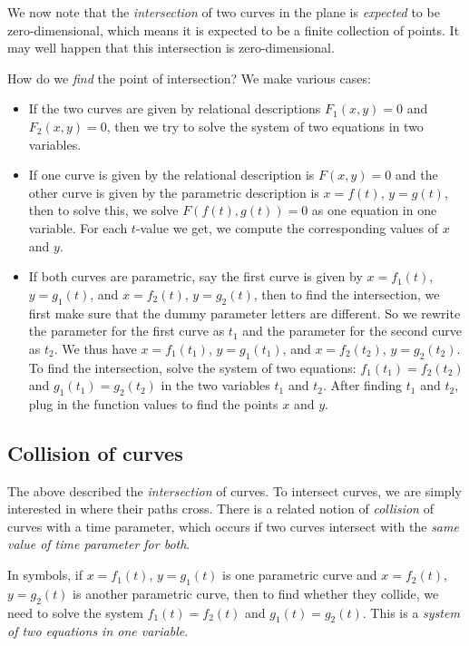 \documentclass[10pt]{amsart}
\begin{document}
We now note that the {\em intersection} of two curves in the plane is
{\em expected} to be zero-dimensional, which means it is expected to
be a finite collection of points. It may well happen that this
intersection is zero-dimensional.

How do we {\em find} the point of intersection? We make various cases:

\begin{itemize}
\item If the two curves are given by relational descriptions $F_1(x,y)
  = 0$ and $F_2(x,y) = 0$, then we try to solve the system of two
  equations in two variables.
\item If one curve is given by the relational description is $F(x,y) =
  0$ and the other curve is given by the parametric description is $x
  = f(t)$, $y = g(t)$, then to solve this, we solve $F(f(t),g(t)) = 0$
  as one equation in one variable. For each $t$-value we get, we
  compute the corresponding values of $x$ and $y$.
\item If both curves are parametric, say the first curve is given by
  $x = f_1(t)$, $y = g_1(t)$, and $x = f_2(t)$, $y = g_2(t)$, then to
  find the intersection, we first make sure that the dummy parameter
  letters are different. So we rewrite the parameter for the first
  curve as $t_1$ and the parameter for the second curve as $t_2$. We
  thus have $x = f_1(t_1)$, $y = g_1(t_1)$, and $x = f_2(t_2)$, $y =
  g_2(t_2)$. To find the intersection, solve the system of two
  equations: $f_1(t_1) = f_2(t_2)$ and $g_1(t_1) = g_2(t_2)$ in the
  two variables $t_1$ and $t_2$. After finding $t_1$ and $t_2$, plug
  in the function values to find the points $x$ and $y$.
\end{itemize}

\subsection{Collision of curves}

The above described the {\em intersection} of curves. To intersect
curves, we are simply interested in where their paths cross. There is
a related notion of {\em collision} of curves with a time parameter,
which occurs if two curves intersect with the {\em same value of time
parameter for both}.

In symbols, if $x = f_1(t)$, $y = g_1(t)$ is one parametric curve and
$x = f_2(t)$, $y = g_2(t)$ is another parametric curve, then to find
whether they collide, we need to solve the system $f_1(t) = f_2(t)$
and $g_1(t) = g_2(t)$. This is a {\em system of two equations in one
variable}.
\end{document}
